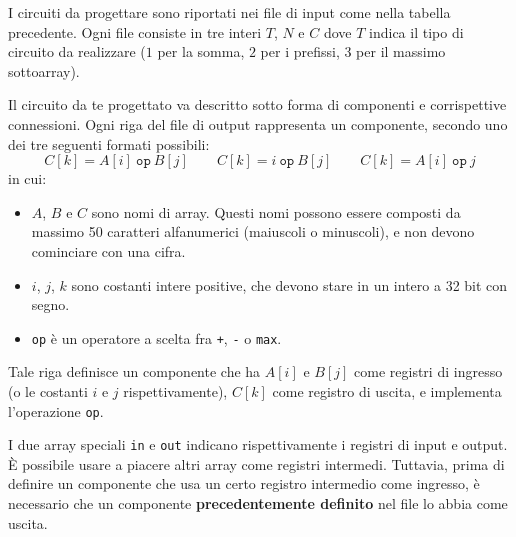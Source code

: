
\InputFormat

I circuiti da progettare sono riportati nei file di input come nella tabella precedente. Ogni file consiste in tre interi $T$, $N$ e $C$ dove $T$ indica il tipo di circuito da realizzare ($1$ per la somma, $2$ per i prefissi, $3$ per il massimo sottoarray).


\OutputFormat

Il circuito da te progettato va descritto sotto forma di componenti e corrispettive connessioni. Ogni riga del file di output rappresenta un componente, secondo uno dei tre seguenti formati possibili:
\[
C[k] = A[i]\ \texttt{op}\ B[j] \qquad C[k] = i\ \texttt{op}\ B[j] \qquad C[k] = A[i]\ \texttt{op}\ j
\]
in cui:
\begin{itemize}
	\item $A$, $B$ e $C$ sono nomi di array. Questi nomi possono essere composti da massimo 50 caratteri alfanumerici (maiuscoli o minuscoli), e non devono cominciare con una cifra.
	\item $i$, $j$, $k$ sono costanti intere positive, che devono stare in un intero a 32 bit con segno.
	\item \texttt{op} è un operatore a scelta fra \texttt{+}, \texttt{-} o \texttt{max}.
\end{itemize}
Tale riga definisce un componente che ha $A[i]$ e $B[j]$ come registri di ingresso (o le costanti $i$ e $j$ rispettivamente), $C[k]$ come registro di uscita, e implementa l'operazione \texttt{op}.

I due array speciali \texttt{in} e \texttt{out} indicano rispettivamente i registri di input e output. È possibile usare a piacere altri array come registri intermedi. Tuttavia, prima di definire un componente che usa un certo registro intermedio come ingresso, è necessario che un componente \textbf{precedentemente definito} nel file lo abbia come uscita.



\Scoring

